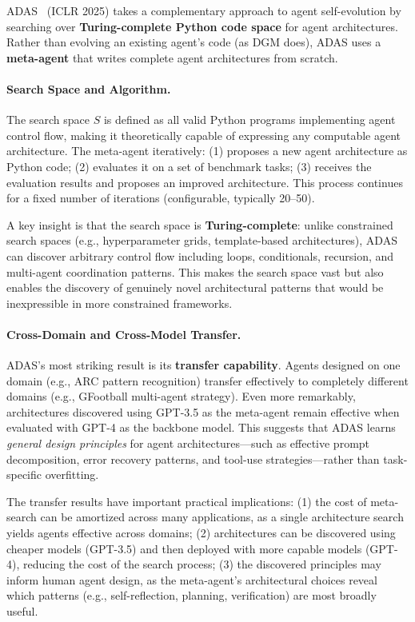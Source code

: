 ADAS~\citep{adas2025} (ICLR 2025) takes a complementary approach to agent self-evolution by searching over \textbf{Turing-complete Python code space} for agent architectures. Rather than evolving an existing agent's code (as DGM does), ADAS uses a \textbf{meta-agent} that writes complete agent architectures from scratch.

\paragraph{Search Space and Algorithm.}
The search space $S$ is defined as all valid Python programs implementing agent control flow, making it theoretically capable of expressing any computable agent architecture. The meta-agent iteratively: (1) proposes a new agent architecture as Python code; (2) evaluates it on a set of benchmark tasks; (3) receives the evaluation results and proposes an improved architecture. This process continues for a fixed number of iterations (configurable, typically 20--50).

A key insight is that the search space is \textbf{Turing-complete}: unlike constrained search spaces (e.g., hyperparameter grids, template-based architectures), ADAS can discover arbitrary control flow including loops, conditionals, recursion, and multi-agent coordination patterns. This makes the search space vast but also enables the discovery of genuinely novel architectural patterns that would be inexpressible in more constrained frameworks.

\paragraph{Cross-Domain and Cross-Model Transfer.}
ADAS's most striking result is its \textbf{transfer capability}. Agents designed on one domain (e.g., ARC pattern recognition) transfer effectively to completely different domains (e.g., GFootball multi-agent strategy). Even more remarkably, architectures discovered using GPT-3.5 as the meta-agent remain effective when evaluated with GPT-4 as the backbone model. This suggests that ADAS learns \emph{general design principles} for agent architectures---such as effective prompt decomposition, error recovery patterns, and tool-use strategies---rather than task-specific overfitting.

The transfer results have important practical implications: (1) the cost of meta-search can be amortized across many applications, as a single architecture search yields agents effective across domains; (2) architectures can be discovered using cheaper models (GPT-3.5) and then deployed with more capable models (GPT-4), reducing the cost of the search process; (3) the discovered principles may inform human agent design, as the meta-agent's architectural choices reveal which patterns (e.g., self-reflection, planning, verification) are most broadly useful.

